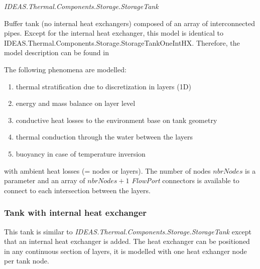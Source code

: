 \emph{IDEAS.Thermal.Components.Storage.StorageTank}

Buffer tank (no internal heat exchangers) composed of an array of interconnected pipes.  Except for the internal heat exchanger, this model is identical to IDEAS.Thermal.Components.Storage.StorageTankOneIntHX. Therefore, the model description can be found in %

The following phenomena are modelled:

\begin{enumerate}
	\item thermal stratification due to discretization in layers (1D)
	\item energy and mass balance on layer level
	\item conductive heat losses to the environment base on tank geometry
	\item thermal conduction through the water between the layers
	\item buoyancy in case of temperature inversion
	
\end{enumerate}
 
 with ambient heat losses (= nodes or layers).  The number of nodes $nbrNodes$ is a parameter and an array of $nbrNodes + 1$ \emph{FlowPort} connectors is available to connect to each intersection between the layers. 



\subsubsection{Tank with internal heat exchanger}
\label{sec:tesHX}


\vspace{6mm}

This tank is similar to \emph{IDEAS.Thermal.Components.Storage.StorageTank} except that an internal heat exchanger is added.  The heat exchanger can be positioned in any continuous section of layers, it is modelled with one heat exhanger node per tank node. 





